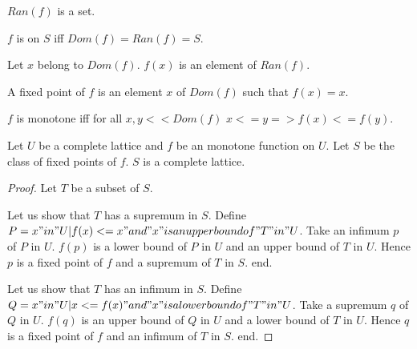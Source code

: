 \documentclass{article}
\begin{document}
\begin{forthel}
    \begin{signature}[RanSort]
      $Ran(f)$ is a set.
    \end{signature}

    \begin{definition}[DefDom]
      $f$ is on $S$ iff $Dom(f) = Ran(f) = S$.
    \end{definition}

    \begin{axiom}[ImgSort]
      Let $x$ belong to $Dom(f)$. $f(x)$ is an element of $Ran(f)$.
    \end{axiom}

    \begin{definition}[DefFix]
      A fixed point of $f$ is an element $x$ of $Dom(f)$ such that $f(x) = x$.
    \end{definition}

    \begin{definition}[DefMonot]
      $f$ is monotone iff for all $x,y << Dom(f)$ $x <= y => f(x) <= f(y)$.
    \end{definition}


    \begin{theorem}[Tarski]
      Let $U$ be a complete lattice and $f$ be an monotone function on $U$. Let $S$ be the class of fixed points of $f$. $S$ is a complete lattice.
    \end{theorem}
    \begin{proof}
      Let $T$ be a subset of $S$.

      Let us show that $T$ has a supremum in $S$.
        Define $P = {x "in" U | f(x) <= x "and" x "is an upper bound of" T "in" U}$. Take an infimum $p$ of $P$ in $U$. $f(p)$ is a lower bound of $P$ in $U$ and an upper bound of $T$ in $U$. Hence $p$ is a fixed point of $f$ and a supremum of $T$ in $S$.
      end.

      Let us show that $T$ has an infimum in $S$.
        Define $Q = {x "in" U | x <= f(x) "and" x "is a lower bound of" T "in" U}$. Take a supremum $q$ of $Q$ in $U$. $f(q)$ is an upper bound of $Q$ in $U$ and a lower bound of $T$ in $U$. Hence $q$ is a fixed point of $f$ and an infimum of $T$ in $S$.
      end.
    \end{proof}
  \end{forthel}
\end{document}
